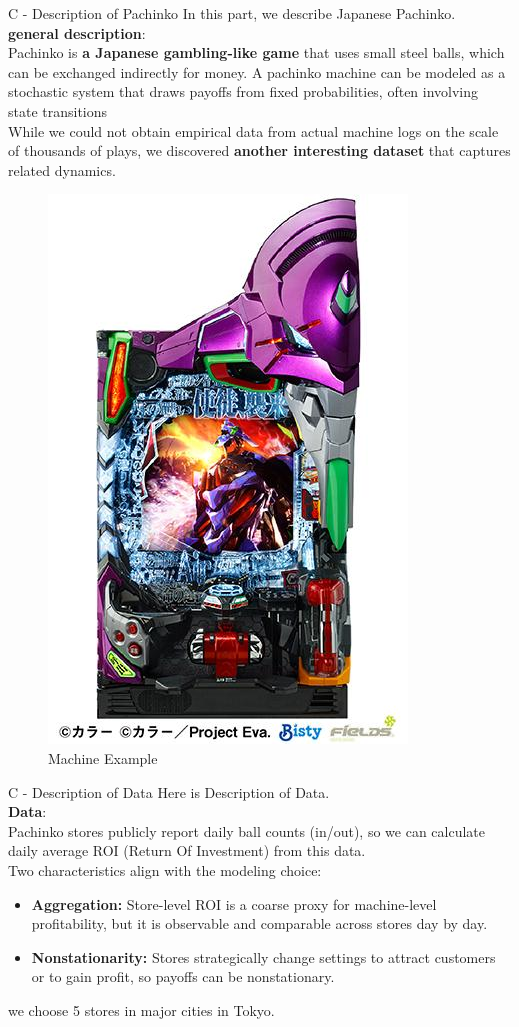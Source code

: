 \documentclass{beamer}
\begin{document}
\begin{frame}{C - Description of Pachinko}
    In this part, we describe Japanese Pachinko.\\
    {\small
    \textbf{general description}:\\
    Pachinko is \textbf{a Japanese gambling-like game} that uses small steel balls, which can be exchanged indirectly for money. A pachinko machine can be modeled as a stochastic system that draws payoffs from fixed probabilities, often involving state transitions\\
    \vspace{1em}
    While we could not obtain empirical data from actual machine logs on the scale of thousands of plays, we discovered \textbf{another interesting dataset} that captures related dynamics.}
    \begin{figure}
        \centering
        \includegraphics[width=0.15\linewidth]{../figures/machine_evangelion.jpg}
        \caption{Machine Example}
        \label{fig:placeholder}
    \end{figure}
\end{frame}

\begin{frame}{C - Description of Data}
Here is Description of Data.\\
\textbf{Data}:\\
Pachinko stores publicly report daily ball counts (in/out), so we can calculate daily average ROI (Return Of Investment) from this data.\\
\vspace{1em}
Two characteristics align with the modeling choice:
\begin{itemize}
  \item \textbf{Aggregation:} Store-level ROI is a coarse proxy for machine-level profitability, but it is observable and comparable across stores day by day.
  \item \textbf{Nonstationarity:} Stores strategically change settings to attract customers or to gain profit, so payoffs can be nonstationary.
\end{itemize}
we choose 5 stores in major cities in Tokyo.
\end{frame}
\end{document}
